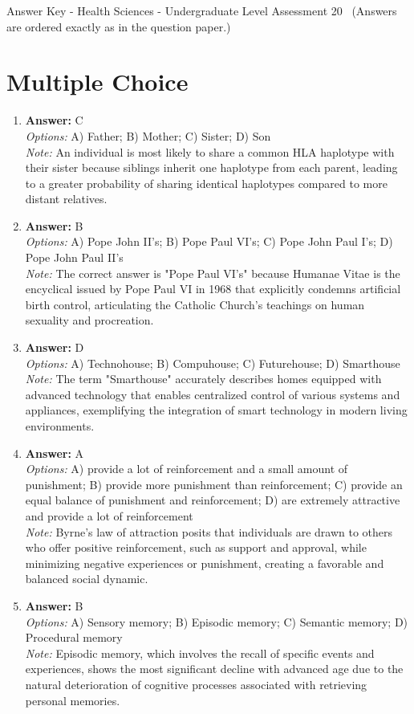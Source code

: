\documentclass[12pt]{article}
\begin{document}
\begin{center}
Answer Key - Health Sciences - Undergraduate Level Assessment 20 \
\small (Answers are ordered exactly as in the question paper.)
\end{center}

\section*{Multiple Choice}
\begin{enumerate}[label=\arabic*.]
\item \textbf{Answer:} C
\\ \textit{Options:} A) Father; B) Mother; C) Sister; D) Son
\\ \textit{Note:} An individual is most likely to share a common HLA haplotype with their sister because siblings inherit one haplotype from each parent, leading to a greater probability of sharing identical haplotypes compared to more distant relatives.
\item \textbf{Answer:} B
\\ \textit{Options:} A) Pope John II's; B) Pope Paul VI's; C) Pope John Paul I's; D) Pope John Paul II's
\\ \textit{Note:} The correct answer is "Pope Paul VI's" because Humanae Vitae is the encyclical issued by Pope Paul VI in 1968 that explicitly condemns artificial birth control, articulating the Catholic Church's teachings on human sexuality and procreation.
\item \textbf{Answer:} D
\\ \textit{Options:} A) Technohouse; B) Compuhouse; C) Futurehouse; D) Smarthouse
\\ \textit{Note:} The term "Smarthouse" accurately describes homes equipped with advanced technology that enables centralized control of various systems and appliances, exemplifying the integration of smart technology in modern living environments.
\item \textbf{Answer:} A
\\ \textit{Options:} A) provide a lot of reinforcement and a small amount of punishment; B) provide more punishment than reinforcement; C) provide an equal balance of punishment and reinforcement; D) are extremely attractive and provide a lot of reinforcement
\\ \textit{Note:} Byrne's law of attraction posits that individuals are drawn to others who offer positive reinforcement, such as support and approval, while minimizing negative experiences or punishment, creating a favorable and balanced social dynamic.
\item \textbf{Answer:} B
\\ \textit{Options:} A) Sensory memory; B) Episodic memory; C) Semantic memory; D) Procedural memory
\\ \textit{Note:} Episodic memory, which involves the recall of specific events and experiences, shows the most significant decline with advanced age due to the natural deterioration of cognitive processes associated with retrieving personal memories.
\end{enumerate}
\end{document}
